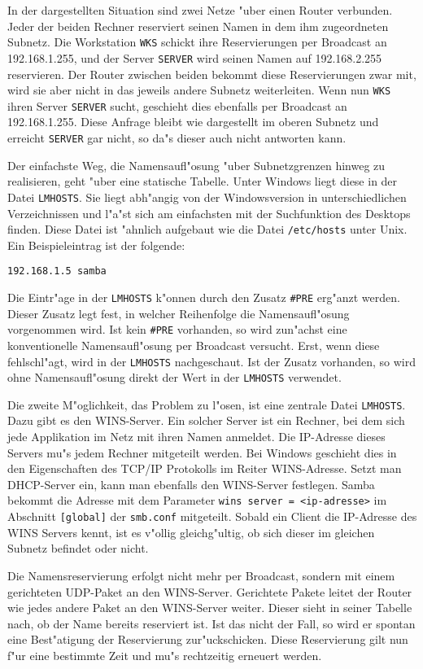 \documentclass{scrartcl}
\newcommand{\param}{\texttt}
\newcommand{\datei}{\texttt}
\newcommand{\nbname}{\texttt}
\begin{document}
In der dargestellten Situation sind zwei Netze "uber einen Router
verbunden. Jeder der beiden Rechner reserviert seinen Namen in dem ihm
zugeordneten Subnetz. Die Workstation \nbname{WKS} schickt ihre
Reservierungen per Broadcast an 192.168.1.255, und der Server
\nbname{SERVER} wird seinen Namen auf 192.168.2.255 reservieren. Der
Router zwischen beiden bekommt diese Reservierungen zwar mit, wird sie
aber nicht in das jeweils andere Subnetz weiterleiten. Wenn nun
\nbname{WKS} ihren Server \nbname{SERVER} sucht, geschieht dies
ebenfalls per Broadcast an 192.168.1.255. Diese Anfrage bleibt wie
dargestellt im oberen Subnetz und erreicht \nbname{SERVER} gar nicht,
so da"s dieser auch nicht antworten kann.

Der einfachste Weg, die Namensaufl"osung "uber Subnetzgrenzen hinweg
zu realisieren, geht "uber eine statische Tabelle. Unter Windows
liegt diese in der Datei \datei{LMHOSTS}. Sie liegt abh"angig von der
Windowsversion in unterschiedlichen Verzeichnissen und l"a"st sich am
einfachsten mit der Suchfunktion des Desktops finden. Diese Datei ist
"ahnlich aufgebaut wie die Datei \datei{/etc/hosts} unter Unix. Ein
Beispieleintrag ist der folgende:

\verb|192.168.1.5 samba|

Die Eintr"age in der \datei{LMHOSTS} k"onnen durch den Zusatz
\texttt{\#PRE} erg"anzt werden. Dieser Zusatz legt fest, in welcher
Reihenfolge die Namensaufl"osung vorgenommen wird. Ist kein
\texttt{\#PRE} vorhanden, so wird zun"achst eine konventionelle
Namensaufl"osung per Broadcast versucht. Erst, wenn diese
fehlschl"agt, wird in der \datei{LMHOSTS} nachgeschaut. Ist der Zusatz
vorhanden, so wird ohne Namensaufl"osung direkt der Wert in der
\datei{LMHOSTS} verwendet.

Die zweite M"oglichkeit, das Problem zu l"osen, ist eine zentrale
Datei \datei{LMHOSTS}. Dazu gibt es den WINS-Server. Ein solcher Server
ist ein Rechner, bei dem sich jede Applikation im Netz mit ihren Namen
anmeldet. Die IP-Adresse dieses Servers mu"s jedem Rechner mitgeteilt
werden. Bei Windows geschieht dies in den Eigenschaften des TCP/IP
Protokolls im Reiter WINS-Adresse. Setzt man DHCP-Server ein, kann man
ebenfalls den WINS-Server festlegen. Samba bekommt die Adresse mit dem
Parameter \param{wins server = <ip-adresse>} im Abschnitt
\param{[global]} der \datei{smb.conf} mitgeteilt. Sobald ein Client
die IP-Adresse des WINS Servers kennt, ist es v"ollig gleichg"ultig,
ob sich dieser im gleichen Subnetz befindet oder nicht.

Die Namensreservierung erfolgt nicht mehr per Broadcast, sondern mit
einem gerichteten UDP-Paket an den WINS-Server.  Gerichtete Pakete
leitet der Router wie jedes andere Paket an den WINS-Server weiter.
Dieser sieht in seiner Tabelle nach, ob der Name bereits reserviert
ist. Ist das nicht der Fall, so wird er spontan eine Best"atigung der
Reservierung zur"uckschicken. Diese Reservierung gilt nun f"ur eine
bestimmte Zeit und mu"s rechtzeitig erneuert werden.
\end{document}

